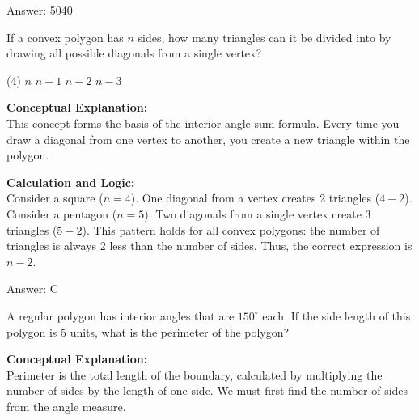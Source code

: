 \documentclass[11pt,paper=a4,answers]{exam}
\begin{document}
\begin{questions}
\begin{solution}
\vspace{30pt}

Answer: \colorbox{yellow!100}{5040}
\end{solution}

\vspace{60pt}

\question
If a convex polygon has $n$ sides, how many triangles can it be divided into by drawing all possible diagonals from a single vertex?
\begin{tasks}(4)
    \task $n$
    \task $n - 1$
    \task $n - 2$
    \task $n - 3$
\end{tasks}

\begin{solution}
\textbf{Conceptual Explanation:} \\
This concept forms the basis of the interior angle sum formula. Every time you draw a diagonal from one vertex to another, you create a new triangle within the polygon.

\vspace{30pt}

\textbf{Calculation and Logic:} \\
Consider a square ($n=4$). One diagonal from a vertex creates 2 triangles ($4-2$). Consider a pentagon ($n=5$). Two diagonals from a single vertex create 3 triangles ($5-2$). This pattern holds for all convex polygons: the number of triangles is always 2 less than the number of sides. Thus, the correct expression is $n - 2$.

\vspace{30pt}

Answer: \colorbox{yellow!100}{C}
\end{solution}

\vspace{60pt}

\question
A regular polygon has interior angles that are $150^\circ$ each. If the side length of this polygon is 5 units, what is the perimeter of the polygon?

\begin{solution}
\textbf{Conceptual Explanation:} \\
Perimeter is the total length of the boundary, calculated by multiplying the number of sides by the length of one side. We must first find the number of sides from the angle measure.


\end{solution}
\end{questions}
\end{document}
